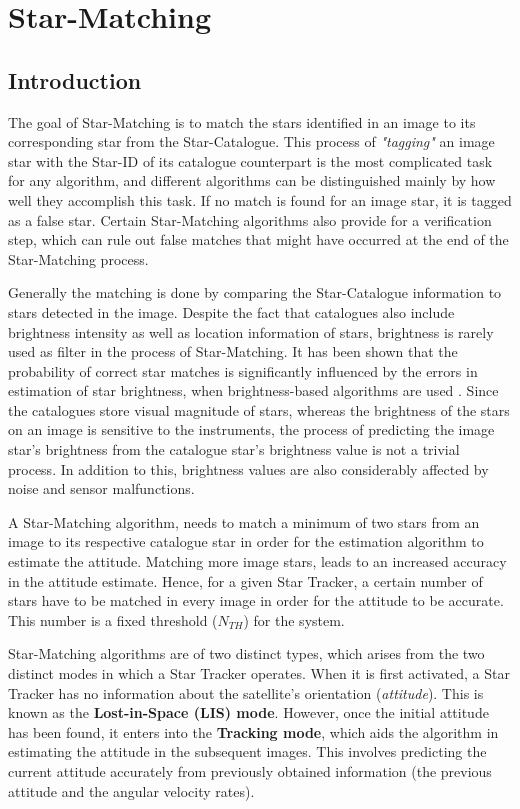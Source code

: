 \section{Star-Matching}

\subsection{Introduction}

The goal of Star-Matching is to match the stars identified in an image to its corresponding star from the Star-Catalogue. This process of \textit{"tagging"} an image star with the Star-ID of its catalogue counterpart is the most complicated task for
any algorithm, and different algorithms can be distinguished mainly by how well they accomplish this task. 
If no match is found for an image star, it is tagged as a false star. Certain Star-Matching algorithms also provide for a verification step, which can rule out false matches that might have occurred at the end of the Star-Matching process.

Generally the matching is done by comparing the Star-Catalogue information to stars detected in the image. Despite the fact that catalogues also include brightness intensity as well as location information of stars, brightness is rarely used as filter in the process of Star-Matching. It has been shown that the probability of correct star matches is significantly influenced by the errors in estimation of star brightness, when brightness-based algorithms are used \cite{accardo2002brightness}.
Since the catalogues store visual magnitude of stars, whereas the brightness of the stars on an image is sensitive to the instruments, the process of predicting the image star's brightness from the catalogue star's brightness value is not a trivial process. In addition to this, brightness values are also considerably affected by noise and sensor malfunctions.

A Star-Matching algorithm, needs to match a minimum of two stars from an image to its respective catalogue star in order for the estimation algorithm to estimate the attitude. 
Matching more image stars, leads to an increased accuracy in the attitude estimate. Hence, for a given Star Tracker, a certain number of stars have to be matched in every image in order for the attitude to be accurate. This number is a fixed threshold ($N_{TH}$) for the system.

Star-Matching algorithms are of two distinct types, which arises from the two distinct modes in which a Star Tracker operates.
When it is first activated, a Star Tracker has no information about the satellite’s orientation (\textit{attitude}). This is known as the \textbf{Lost-in-Space (LIS) mode}. However, once the initial attitude has been found, it enters into the \textbf{Tracking mode}, which aids the algorithm in
estimating the attitude in the subsequent images. This involves predicting the current attitude accurately from
previously obtained information (the previous attitude and the angular velocity rates).


